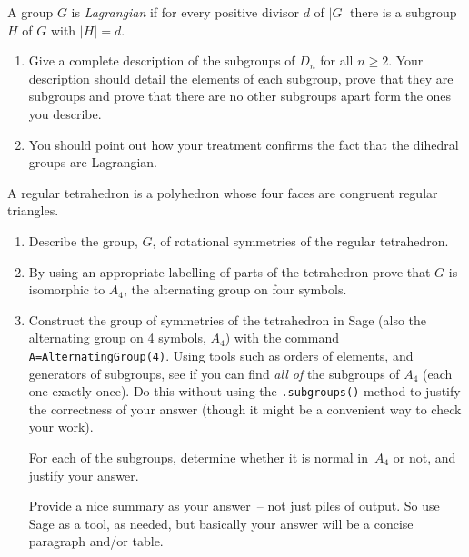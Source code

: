 \documentclass[oneside,10pt]{amsart}
\begin{document}
\noindent
A group $G$ is \emph{Lagrangian} if for every positive divisor $d$ of $|G|$ there is a subgroup $H$ of $G$ with $|H| = d$.
\begin{enumerate}[label=(\alph*)]
\item
Give a complete description of the subgroups of $D_n$ for all $n \geq 2$. Your description should detail the elements of each subgroup, prove that they are subgroups and prove that there are no other subgroups apart form the ones you describe.
\item
You should point out how your treatment confirms the fact that the dihedral groups are Lagrangian.
\end{enumerate}
A regular tetrahedron is a polyhedron whose four faces are congruent regular triangles.
\begin{enumerate}[label=(\alph*)]
\item
Describe the group, $G$, of rotational symmetries of the regular tetrahedron.
\item
By using an appropriate labelling of parts of the tetrahedron prove that $G$ is isomorphic to $A_4$, the alternating group on four symbols.
\item
Construct the group of symmetries of the tetrahedron in Sage (also the alternating group on 4 symbols, \(A_4\)) with the command \texttt{A=AlternatingGroup(4)}.  Using tools such as orders of elements, and generators of subgroups, see if you can find \emph{all of} the subgroups of \(A_4\) (each one exactly once).  Do this without using the \texttt{.subgroups()} method to justify the correctness of your answer (though it might be a convenient way to check your work).%

For each of the subgroups, determine whether it is normal in~$A_4$ or not, and justify your answer.

Provide a nice summary as your answer~-- not just piles of output.  So use Sage as a tool, as needed, but basically your answer will be a concise paragraph and/or table.
\end{enumerate}
\end{document}
